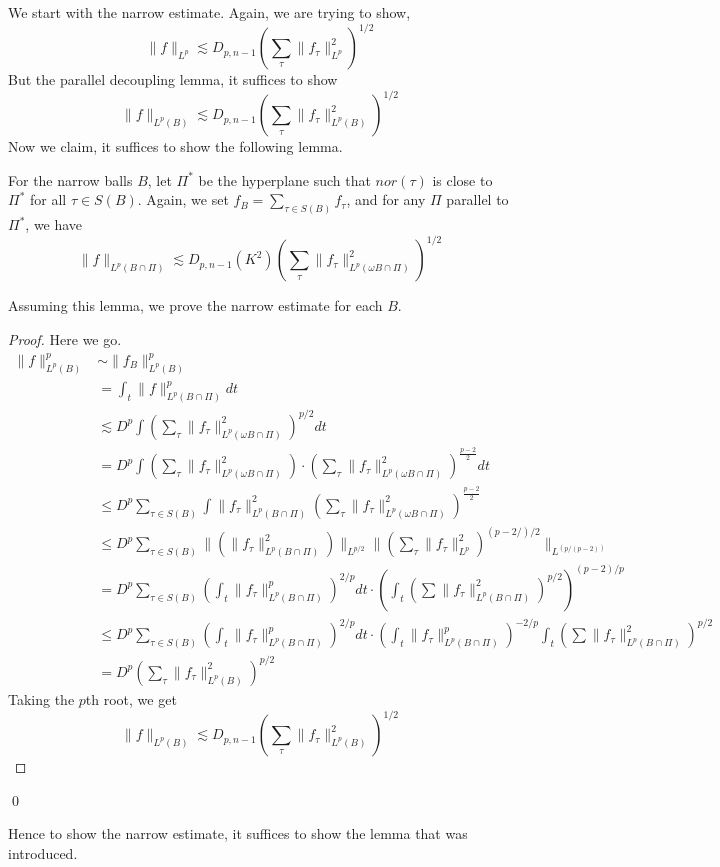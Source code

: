 We start with the narrow estimate.
Again, we are trying to show,
\begin{equation*}
    \|f\|_{L^p}\lesssim D_{p,n-1}\left(\sum_\tau\|f_\tau\|_{L^p}^2 \right)^{1/2}
\end{equation*}
But the parallel decoupling lemma, it suffices to show
\begin{equation*}
    \|f\|_{L^p(B)}\lesssim D_{p,n-1}\left(\sum_\tau\|f_\tau\|_{L^p(B)}^2 \right)^{1/2}
\end{equation*}
Now we claim, it suffices to show the following lemma.
\begin{lemma}
    For the narrow balls $B$, let $\Pi^*$ be the hyperplane such that $nor(\tau)$ is close to $\Pi^*$ for all $\tau\in S(B)$. Again, we set $f_B=\sum_{\tau\in S(B)}f_\tau$, and for any $\Pi$ parallel to $\Pi^*$, we have
    \begin{equation*}
        \|f\|_{L^p(B\cap\Pi)}\lesssim D_{p,n-1}(K^2)\left(\sum_\tau\|f_\tau\|_{L^p(\omega B\cap\Pi)}^2 \right)^{1/2}
    \end{equation*}
\end{lemma}
Assuming this lemma, we prove the narrow estimate for each $B$.
\begin{proof}
Here we go.
\begin{align*}
    \|f\|_{L^p(B)}^p&\sim\|f_B\|_{L^p(B)}^p\\
    &=\int_t\|f\|_{L^p(B\cap\Pi)}^pdt\\
    &\lesssim D^p\int\left(\sum_\tau\|f_\tau\|_{L^p(\omega B\cap\Pi)}^2 \right)^{p/2}dt\\
    &=D^p\int \left(\sum_\tau\|f_\tau\|_{L^p(\omega B\cap\Pi)}^2 \right)\cdot \left(\sum_\tau\|f_\tau\|_{L^p(\omega B\cap\Pi)}^2\right)^{\frac{p-2}{2}}dt\\
    &\leq D^p\sum_{\tau\in S(B)}\int\|f_\tau\|_{L^p(B\cap\Pi)}^2 \left(\sum_\tau\|f_\tau\|_{L^p(\omega B\cap\Pi)}^2\right)^{\frac{p-2}{2}}\\
    &\leq D^p\sum_{\tau\in S(B)}\|(\|f_\tau\|_{L^p(B\cap\Pi)}^2)\|_{L^{p/2}}\|(\sum_\tau\|f_\tau\|_{L^p}^2)^{(p-2/)/2}\|_{L^(p/(p-2))}\\
    &=D^p\sum_{\tau\in S(B)}\left(\int_t\|f_\tau\|_{L^p(B\cap\Pi)}^p\right)^{2/p} dt\cdot \left(\int_t\left(\sum\|f_\tau\|_{L^p(B\cap\Pi)}^2\right)^{p/2}\right)^{(p-2)/p}\\
    &\leq D^p\sum_{\tau\in S(B)}\left(\int_t\|f_\tau\|_{L^p(B\cap\Pi)}^p\right)^{2/p} dt\cdot \left(\int_t\|f_\tau\|_{L^p(B\cap\Pi)}^p\right)^{-2/p}\int_t\left(\sum\|f_\tau\|_{L^p(B\cap\Pi)}^2\right)^{p/2}\\
    &=D^p\left(\sum_\tau\|f_\tau\|_{L^p(B)}^2 \right)^{p/2}
\end{align*}
Taking the $p$th root, we get 
\begin{equation*}
    \|f\|_{L^p(B)}\lesssim D_{p,n-1}\left(\sum_\tau\|f_\tau\|_{L^p(B)}^2\right)^{1/2}
\end{equation*}
\end{proof}
\qed

Hence to show the narrow estimate, it suffices to show the lemma that was introduced. 
